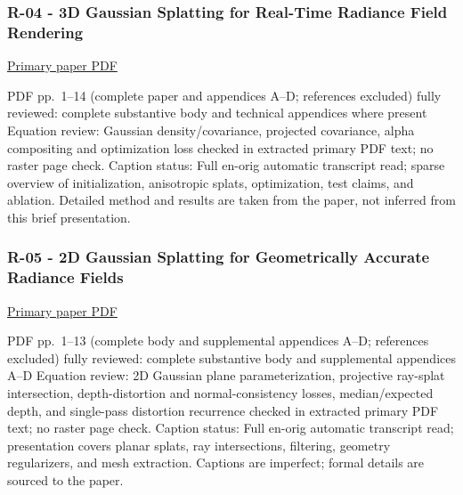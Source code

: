 \subsubsection{R-04 - 3D Gaussian Splatting for Real-Time Radiance Field Rendering}\label{04-visual-computing-ii-ch036-r-04---3d-gaussian-splatting-for-real-time-radiance-field-rendering}

\hypertarget{04-visual-computing-ii-ch036-r-04---3d-gaussian-splatting-for-real-time-radiance-field-rendering}{}

\href{https://repo-sam.inria.fr/fungraph/3d-gaussian-splatting/3d_gaussian_splatting_low.pdf}{Primary paper PDF}

PDF pp.~1--14 (complete paper and appendices A--D; references excluded) fully reviewed: complete substantive body and technical appendices where present Equation review: Gaussian density/covariance, projected covariance, alpha compositing and optimization loss checked in extracted primary PDF text; no raster page check. Caption status: Full en-orig automatic transcript read; sparse overview of initialization, anisotropic splats, optimization, test claims, and ablation. Detailed method and results are taken from the paper, not inferred from this brief presentation.

\subsubsection{R-05 - 2D Gaussian Splatting for Geometrically Accurate Radiance Fields}\label{04-visual-computing-ii-ch036-r-05---2d-gaussian-splatting-for-geometrically-accurate-radiance-fields}

\hypertarget{04-visual-computing-ii-ch036-r-05---2d-gaussian-splatting-for-geometrically-accurate-radiance-fields}{}

\href{https://arxiv.org/pdf/2403.17888}{Primary paper PDF}

PDF pp.~1--13 (complete body and supplemental appendices A--D; references excluded) fully reviewed: complete substantive body and supplemental appendices A--D Equation review: 2D Gaussian plane parameterization, projective ray-splat intersection, depth-distortion and normal-consistency losses, median/expected depth, and single-pass distortion recurrence checked in extracted primary PDF text; no raster page check. Caption status: Full en-orig automatic transcript read; presentation covers planar splats, ray intersections, filtering, geometry regularizers, and mesh extraction. Captions are imperfect; formal details are sourced to the paper.

